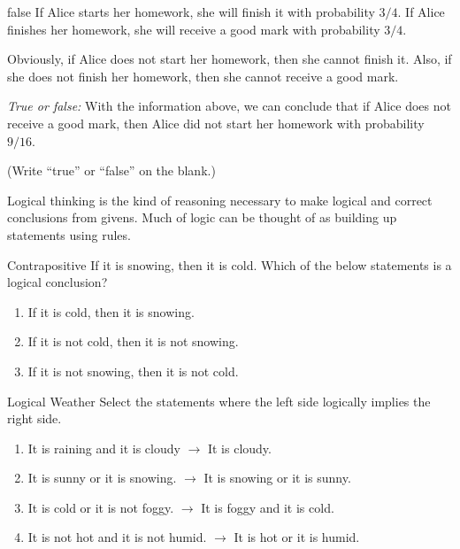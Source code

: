 \documentclass[a4paper,10pt]{report}
\begin{document}
\begin{problem}{false}
  If Alice starts her homework, she will finish it with probability \(3/4\). If Alice
  finishes her homework, she will receive a good mark with probability \(3/4\).

  Obviously, if Alice does not start her homework, then she cannot finish it. Also, if she
  does not finish her homework, then she cannot receive a good mark.

  \textit{True or false:}
  With the information above, we can conclude that if Alice does not receive a good mark,
  then Alice did not start her homework with probability \(9/16\).

  (Write ``true'' or ``false'' on the blank.)
\end{problem}


Logical thinking is the kind of reasoning necessary to make logical and correct
conclusions from givens. Much of logic can be thought of as building up
statements using rules.

\begin{problem}{Contrapositive}
If it is snowing, then it is cold. Which of the below statements is a logical
conclusion?

\begin{enumerate}[\hspace{.5cm}a.]
\item If it is cold, then it is snowing.
\item If it is not cold, then it is not snowing.
\item If it is not snowing, then it is not cold.
\end{enumerate}
\end{problem}

\begin{problem}{Logical Weather}
Select the statements where the left side logically implies the right side.

\begin{enumerate}[\hspace{.5cm}a.]
\item It is raining and it is cloudy $\to$ It is cloudy.
\item It is sunny or it is snowing. $\to$ It is snowing or it is sunny.
\item It is cold or it is not foggy. $\to$ It is foggy and it is cold.
\item It is not hot and it is not humid. $\to$ It is hot or it is humid.
\end{enumerate}
\end{problem}
\end{document}
